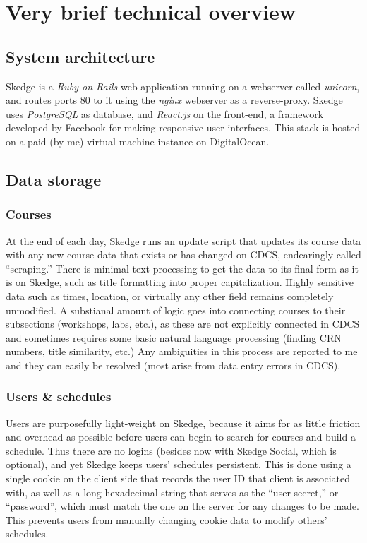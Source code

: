 
\chapter{Very brief technical overview}

\section{System architecture}

Skedge is a \emph{Ruby on Rails} web application running on a webserver called \emph{unicorn}, and routes ports 80 to it using the \emph{nginx} webserver as a reverse-proxy. Skedge uses \emph{PostgreSQL} as database, and \emph{React.js} on the front-end, a framework developed by Facebook for making responsive user interfaces. This stack is hosted on a paid (by me) virtual machine instance on DigitalOcean. 

\section{Data storage}

\subsection{Courses}

At the end of each day, Skedge runs an update script that updates its course data with any new course data that exists or has changed on CDCS, endearingly called ``scraping.'' There is minimal text processing to get the data to its final form as it is on Skedge, such as title formatting into proper capitalization. Highly sensitive data such as times, location, or virtually any other field remains completely unmodified. A substianal amount of logic goes into connecting courses to their subsections (workshops, labs, etc.), as these are not explicitly connected in CDCS and sometimes requires some basic natural language processing (finding CRN numbers, title similarity, etc.) Any ambiguities in this process are reported to me and they can easily be resolved (most arise from data entry errors in CDCS).

\subsection{Users \& schedules}

Users are purposefully light-weight on Skedge, because it aims for as little friction and overhead as possible before users can begin to search for courses and build a schedule. Thus there are no logins (besides now with Skedge Social, which is optional), and yet Skedge keeps users' schedules persistent. This is done using a single cookie on the client side that records the user ID that client is associated with, as well as a long hexadecimal string that serves as the ``user secret,'' or ``password'', which must match the one on the server for any changes to be made. This prevents users from manually changing cookie data to modify others' schedules.

